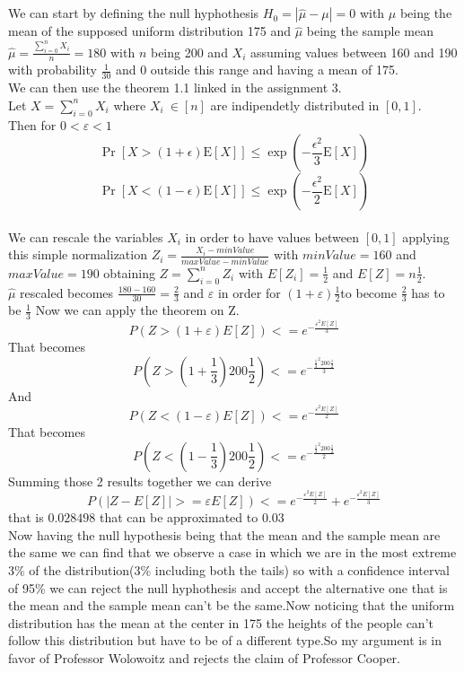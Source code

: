 \documentclass{article}
\begin{document}
\section{}
We can start by defining the null hyphothesis $H_0=|\hat{\mu}-\mu|=0$ with $\mu$ being the mean of the supposed uniform distribution 175 and $\hat{\mu}$ being the sample mean $\hat{\mu}=\frac{\sum_{i=0}^n X_i}{n}=180$ with $n$ being 200 and $X_i$ assuming values between 160 and 190 with probability $\frac{1}{30}$ and 0 outside this range and having a mean of 175.
\\We can then use the theorem 1.1 linked in the assignment 3.
\\Let $X=\sum_{i=0}^nX_i$ where $X_i \ \in [n]$ are indipendetly distributed in $[0,1]$.\\
Then for $0<\varepsilon<1$ $$\operatorname{Pr}[X>(1+\epsilon) \mathrm{E}[X]] \leq \exp \left(-\frac{\epsilon^2}{3} \mathrm{E}[X]\right)$$  $$\operatorname{Pr}[X<(1-\epsilon) \mathrm{E}[X]] \leq \exp \left(-\frac{\epsilon^2}{2} \mathrm{E}[X]\right)$$
\\We can rescale the variables $X_i$ in order to have values between $[0,1]$ applying this simple normalization $Z_i=\frac{X_i-minValue}{maxValue-minValue}$ with $minValue=160$ and $maxValue=190$ obtaining $Z=\sum_{i=0}^n Z_i$ with $E[Z_i]=\frac{1}{2}$ and $E[Z]=n\frac{1}{2}$.\\
$\hat{\mu}$ rescaled becomes $\frac{180-160}{30}=\frac{2}{3}$ and $\varepsilon$ in order for $(1+\varepsilon)\frac{1}{2}$to become $\frac{2}{3}$ has to be $\frac{1}{3}$
Now we can apply the theorem on Z.\\

$$P(Z>(1+\varepsilon)E[Z])<=e^{-\frac{\varepsilon^2 E[Z]}{3}}$$
That becomes
$$P(Z>(1+\frac{1}{3})200\frac{1}{2})<=e^{-\frac{\frac{1}{3}^2 200\frac{1}{2}}{3}}$$
And
$$P(Z<(1-\varepsilon)E[Z])<=e^{-\frac{\varepsilon^2 E[Z]}{2}}$$
That becomes
$$P(Z<(1-\frac{1}{3})200\frac{1}{2})<=e^{-\frac{\frac{1}{3}^2 200\frac{1}{2}}{2}}$$
Summing those 2 results together we can derive 
$$P(|Z-E[Z]|>=\varepsilon E[Z])<=e^{-\frac{\varepsilon^2 E[Z]}{2}}+e^{-\frac{\varepsilon^2 E[Z]}{3}}$$ that is $0.028498$ that can be approximated to $0.03$\\
Now having the null hypothesis being that the mean and the sample mean are the same we can find that we observe a case in which we are in the most extreme 3\% of the distribution(3\% including both the tails) so with a confidence interval of 95\% we can reject the null hyphothesis and accept the alternative one that is the mean and the sample mean can't be the same.Now noticing that the uniform distribution has the mean at the center in 175 the heights of the people can't follow this distribution but have to be of a different type.So my argument is in favor of Professor Wolowoitz and rejects the claim of Professor Cooper.
\end{document}
